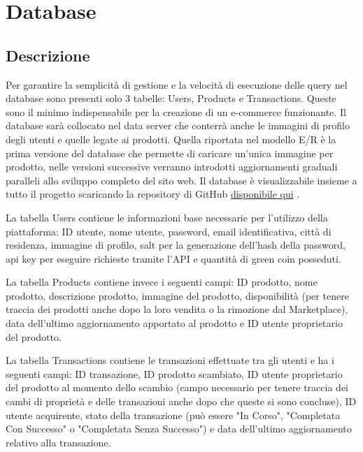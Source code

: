 \section{Database}
\subsection{Descrizione}
Per garantire la semplicità di gestione e la velocità di esecuzione delle query nel database sono presenti solo 3 tabelle: Users, Products e Transactions. Queste sono il minimo indispensabile per la creazione di un e-commerce funzionante. Il database sarà collocato nel data server che conterrà anche le immagini di profilo degli utenti e quelle legate ai prodotti. Quella riportata nel modello E/R è la prima versione del database che permette di caricare un'unica immagine per prodotto, nelle versioni successive verranno introdotti aggiornamenti graduali paralleli allo sviluppo completo del sito web. Il database è visualizzabile insieme a tutto il progetto scaricando la repository di GitHub \href{https://github.com/MauroPello/elaborato}{disponibile qui} \cite{GitHub}. 
\medskip

La tabella Users contiene le informazioni base necessarie per l'utilizzo della piattaforma: ID utente, nome utente, password, email identificativa, città di residenza, immagine di profilo, salt per la generazione dell'hash della password, api key per eseguire richieste tramite l'API e quantità di green coin posseduti. 
\medskip

La tabella Products contiene invece i seguenti campi: ID prodotto, nome prodotto, descrizione prodotto, immagine del prodotto, disponibilità (per tenere traccia dei prodotti anche dopo la loro vendita o la rimozione dal Marketplace), data dell'ultimo aggiornamento apportato al prodotto e ID utente proprietario del prodotto. 
\medskip

La tabella Transactions contiene le transazioni effettuate tra gli utenti e ha i seguenti campi: ID transazione, ID prodotto scambiato, ID utente proprietario del prodotto al momento dello scambio (campo necessario per tenere traccia dei cambi di proprietà e delle transazioni anche dopo che queste si sono concluse), ID utente acquirente, stato della transazione (può essere "In Corso", "Completata Con Successo" o "Completata Senza Successo") e data dell'ultimo aggiornamento relativo alla transazione. 
